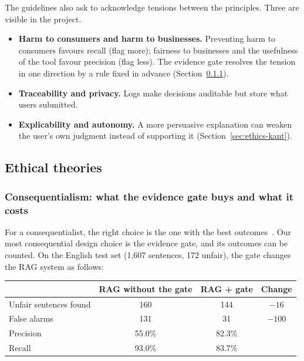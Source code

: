 The guidelines also ask to acknowledge tensions between the principles. Three are visible in the project.
\begin{itemize}
  \item \textbf{Harm to consumers and harm to businesses.} Preventing harm to consumers favours recall (flag more); fairness to businesses and the usefulness of the tool favour precision (flag less). The evidence gate resolves the tension in one direction by a rule fixed in advance (Section~\ref{sec:ethics-consequences}).
  \item \textbf{Traceability and privacy.} Logs make decisions auditable but store what users submitted.
  \item \textbf{Explicability and autonomy.} A more persuasive explanation can weaken the user's own judgment instead of supporting it (Section~\ref{sec:ethics-kant}).
\end{itemize}

\subsection{Ethical theories}

\subsubsection{Consequentialism: what the evidence gate buys and what it costs}
\label{sec:ethics-consequences}

For a consequentialist, the right choice is the one with the best outcomes~\citep{slides_consequentialism}. Our most consequential design choice is the evidence gate, and its outcomes can be counted. On the English test set (1,607 sentences, 172 unfair), the gate changes the RAG system as follows:

\begin{center}\small
\begin{tabular}{@{}lccc@{}}
\toprule
& RAG without the gate & RAG + gate & Change \\
\midrule
Unfair sentences found & 160 & 144 & $-16$ \\
False alarms & 131 & 31 & $-100$ \\
Precision & 55.0\% & 82.3\% & \\
Recall & 93.0\% & 83.7\% & \\
\bottomrule
\end{tabular}
\end{center}

